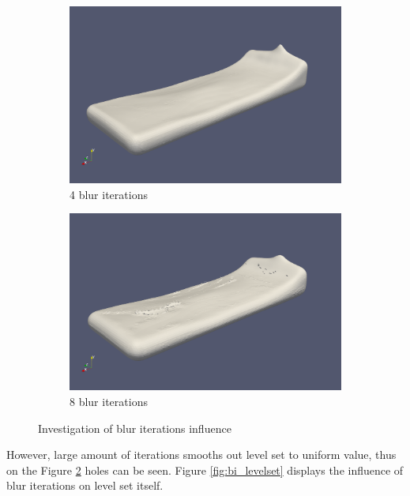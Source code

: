 \begin{figure}

        \begin{subfigure}[b]{\textwidth}
               \includegraphics[width=\textwidth]{figures/ReconstructionIterations4.png}
				\caption{4 blur iterations}
               \label{fig:bi_4iteration}
        \end{subfigure}
        \begin{subfigure}[b]{\textwidth}
               \includegraphics[width=\textwidth]{figures/ReconstructionIterations8.png}
				\caption{8 blur iterations}
               \label{fig:bi_8iteration}
        \end{subfigure}
       \caption{Investigation of blur iterations influence}
       \label{fig:bi_reconstruction2}
\end{figure}
However, large amount of iterations smooths out level set to uniform value, thus on the Figure \ref{fig:bi_8iteration} holes can be seen. Figure \ref{fig:bi_levelset} displays the influence of blur iterations on level set itself. 
